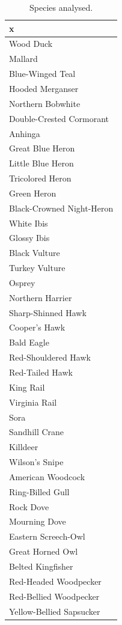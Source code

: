 \documentclass[]{article}
\begin{document}
\begingroup\fontsize{9}{11}\selectfont

\begin{longtable}{l}
\caption{\label{tab:sppAnalysedTab}Species analysed.}\\
\toprule
x\\
\midrule
Wood Duck\\
Mallard\\
Blue-Winged Teal\\
Hooded Merganser\\
Northern Bobwhite\\
\addlinespace
Double-Crested Cormorant\\
Anhinga\\
Great Blue Heron\\
Little Blue Heron\\
Tricolored Heron\\
\addlinespace
Green Heron\\
Black-Crowned Night-Heron\\
White Ibis\\
Glossy Ibis\\
Black Vulture\\
\addlinespace
Turkey Vulture\\
Osprey\\
Northern Harrier\\
Sharp-Shinned Hawk\\
Cooper's Hawk\\
\addlinespace
Bald Eagle\\
Red-Shouldered Hawk\\
Red-Tailed Hawk\\
King Rail\\
Virginia Rail\\
\addlinespace
Sora\\
Sandhill Crane\\
Killdeer\\
Wilson's Snipe\\
American Woodcock\\
\addlinespace
Ring-Billed Gull\\
Rock Dove\\
Mourning Dove\\
Eastern Screech-Owl\\
Great Horned Owl\\
\addlinespace
Belted Kingfisher\\
Red-Headed Woodpecker\\
Red-Bellied Woodpecker\\
Yellow-Bellied Sapsucker\\

\end{longtable}
\end{document}
